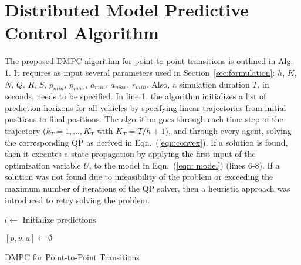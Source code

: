 \section{Distributed Model Predictive Control Algorithm}
\label{sec:problemStatement}
The proposed DMPC algorithm for point-to-point transitions is outlined in Alg. 1. It requires as input several parameters used in Section~\ref{sec:formulation}: $h$, $K$, $N$, $Q$, $R$, $S$, $p_{min}$, $p_{max}$, $a_{min}$, $a_{max}$, $r_{min}$. Also, a simulation duration $T$, in seconds, needs to be specified. In line 1, the algorithm initializes a list of prediction horizons for all vehicles by specifying linear trajectories from initial positions to final positions. The algorithm goes through each time step of the trajectory ($k_T = {1,...,K_T}$ with $K_T = T/h + 1$), and through every agent, solving the corresponding QP as derived in Eqn.~(\ref{eqn:convex}). If a solution is found, then it executes a state propagation by applying the first input of the optimization variable $U$, to the model in  Eqn.~(\ref{eqn: model}) (lines 6-8). If a solution was not found due to infeasibility of the problem or exceeding the maximum number of iterations of the QP solver, then a heuristic approach was introduced to retry solving the problem.

\begin{algorithm}
	
	$l \leftarrow$ Initialize predictions
	
{$[p,v,a] \leftarrow \emptyset$ 
}
\KwRet {[p,v,a]}
\caption{DMPC for Point-to-Point Transitions}
\end{algorithm}

